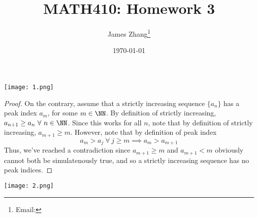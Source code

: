 \documentclass[12pt]{scrartcl}
\begin{document}
\title{MATH410: Homework 3}
\author{James Zhang\thanks{Email: }}
\date{\today}



\maketitle

\texttt{[image: 1.png]}

\begin{proof}
  
\hfill

On the contrary, assume that a strictly increasing sequence $\{a_n\}$ has a peak index $a_m$, for some 
$m \in \NN$. By definition of strictly increasing, $a_{n+1} \geq a_n \ \forall \ n \in \NN$.
Since this works for all $n$, note that by definition of strictly increasing, $a_{m+1} \geq m$.
However, note that by definition of peak index
\[a_m > a_j \ \forall \ j \geq m \implies a_m > a_{m+1}\]
Thus, we've reached a contradiction since $a_{m+1} \geq m$ and $a_{m+1} < m$ obviously cannot
both be simulatenously true, and so a strictly increasing sequence has no peak indices.
\end{proof}

\newpage

\texttt{[image: 2.png]}
\end{document}
